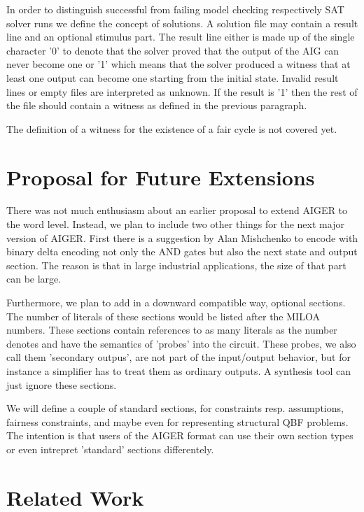 \documentclass{llncs}
\begin{document}
  In order to distinguish successful from failing model checking
  respectively SAT solver runs we define the concept of solutions.  A
  solution file may contain a result line and an optional stimulus part.
  The result line either is made up of the single character '0' to denote
  that the solver proved that the output of the AIG can never become one or
  '1' which means that the solver produced a witness that at least one
  output can become one starting from the initial state.  Invalid result
  lines or empty files are interpreted as unknown.  If the result is '1'
  then the rest of the file should contain a witness as defined in the
  previous paragraph.

  The definition of a witness for the existence of a fair cycle is not
  covered yet.

\section{Proposal for Future Extensions}

  There was not much enthusiasm about an earlier proposal to extend AIGER to
  the word level.  Instead, we plan to include two other things for the next
  major version of AIGER.  First there is a suggestion by Alan Mishchenko to
  encode with binary delta encoding not only the AND gates but also the next
  state and output section.  The reason is that in large industrial
  applications, the size of that part can be large.
  
  Furthermore, we plan to add in a downward compatible way, optional
  sections.  The number of literals of these sections would be listed after
  the MILOA numbers.  These sections contain references to as many literals
  as the number denotes and have the semantics of 'probes' into the circuit.
  These probes, we also call them 'secondary outpus', are not part of the
  input/output behavior, but for instance a simplifier has to treat them as
  ordinary outputs.  A synthesis tool can just ignore these sections.
  
  We will define a couple of standard sections, for constraints resp.
  assumptions, fairness constraints, and maybe even for representing
  structural QBF problems.  The intention is that users of the AIGER format
  can use their own section types or even intrepret 'standard' sections
  differentely.
  
\section{Related Work}
\end{document}
